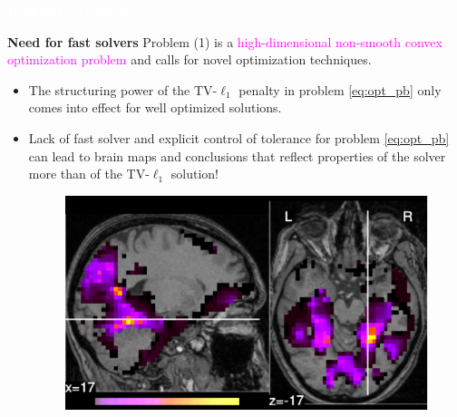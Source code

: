\documentclass[french]{STIC_poster}
\begin{document}
\begin{frame}[t]
\begin{columns}[t]
\begin{column}{.48\linewidth}
\begin{abox}{\textbf{\textcolor{white}{Problem statement}}}
				\begin{nbox}[\textwidth]{\textbf{Need for fast solvers}}
                                  Problem (1) is a \textcolor{magenta}{high-dimensional non-smooth convex optimization problem} and calls for novel optimization techniques. %
                                  \begin{itemize}
                                    \item The structuring power of the TV-$\ell_1$ penalty in problem \eqref{eq:opt_pb} only comes into effect for well optimized solutions.
                                  \item Lack of fast solver and explicit control of
                                    tolerance for problem \eqref{eq:opt_pb} can lead to brain maps and conclusions that reflect
                                    properties of the solver more than of the TV-$\ell_{1}$ solution!
                                  \begin{figure}
                                    \includegraphics[width=.32\linewidth]{maps/face_vs_house_tol_0_1.pdf}%
                                    \llap{\color{green}\raisebox{.161\linewidth}{\rlap{\sffamily %
}}}
\end{figure}
\end{itemize}
\end{nbox}
\end{abox}
\end{column}
\end{columns}
\end{frame}
\end{document}

